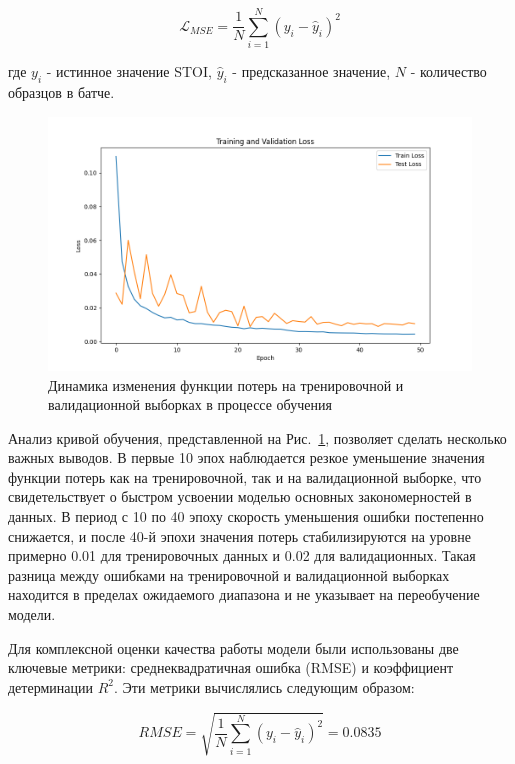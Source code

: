 \documentclass[oneside, final, 14pt]{extarticle}
\begin{document}
\begin{equation}
\mathcal{L}_{MSE} = \frac{1}{N}\sum_{i=1}^N(y_i - \hat{y}_i)^2
\end{equation}

где $y_i$ - истинное значение STOI, $\hat{y}_i$ - предсказанное значение, $N$ - количество образцов в батче.

\begin{figure}[]
\centering
\includegraphics[width=1\linewidth]{training_curve.png}
\caption{Динамика изменения функции потерь на тренировочной и валидационной выборках в процессе обучения}
\label{fig:training_curve}
\end{figure}

Анализ кривой обучения, представленной на Рис.~\ref{fig:training_curve}, позволяет сделать несколько важных выводов. В первые 10 эпох наблюдается резкое уменьшение значения функции потерь как на тренировочной, так и на валидационной выборке, что свидетельствует о быстром усвоении моделью основных закономерностей в данных. В период с 10 по 40 эпоху скорость уменьшения ошибки постепенно снижается, и после 40-й эпохи значения потерь стабилизируются на уровне примерно 0.01 для тренировочных данных и 0.02 для валидационных. Такая разница между ошибками на тренировочной и валидационной выборках находится в пределах ожидаемого диапазона и не указывает на переобучение модели.

Для комплексной оценки качества работы модели были использованы две ключевые метрики: среднеквадратичная ошибка (RMSE) и коэффициент детерминации $R^2$. Эти метрики вычислялись следующим образом:

\begin{equation}
RMSE = \sqrt{\frac{1}{N}\sum_{i=1}^N(y_i - \hat{y}_i)^2} = 0.0835
\end{equation}
\end{document}
